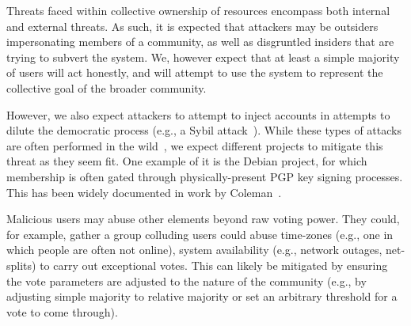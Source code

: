 Threats faced within collective ownership of resources encompass both internal and external threats.
As such, it is expected that attackers may be outsiders impersonating members of a community, as 
well as disgruntled insiders that are trying to subvert the system. We, however expect that at 
least a simple majority of users will act honestly, and will attempt to use the system to 
represent the collective goal of the broader community.

However, we also expect attackers to attempt to inject accounts in attempts to dilute the 
democratic process (e.g., a Sybil attack~\cite{sybil1, sybil2}). While these types of attacks are often performed 
in the wild~\cite{tor-sybil}, we expect different projects to mitigate this threat as they seem fit. 
One example of it is the  Debian project, for which membership is often gated through 
physically-present PGP key signing processes. This has been widely documented in work by Coleman~\cite{coleman-oss}. 

Malicious users may abuse other elements beyond raw voting power. They could, for example, 
gather a group colluding users could abuse time-zones (e.g., one in which people are 
often not online), system availability (e.g., network outages, net-splits) to carry out 
exceptional votes. This can likely be mitigated by ensuring the vote parameters 
are adjusted to the nature of the community (e.g., by adjusting simple majority to 
relative majority or set an arbitrary threshold for a vote to come through).